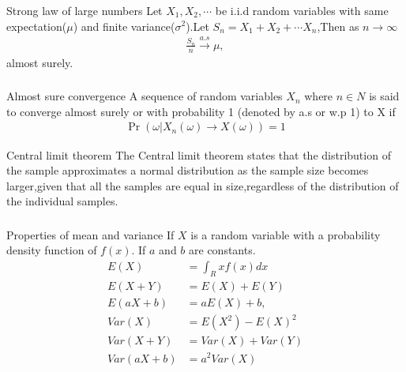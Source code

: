\documentclass{beamer}
\providecommand{\pr}[1]{\ensuremath{\Pr\left(#1\right)}}
\begin{document}
\begin{frame}
\frametitle{}
\begin{block}{Strong law of large numbers}
Let $X_1,X_2,\cdots $ be i.i.d random variables with same expectation($\mu$) and finite variance($\sigma^2$).Let $S_{n}=X_1+X_2+\cdots X_n$,Then as $n \to \infty$
\begin{align}
    \frac{S_n}{n} \xrightarrow{a.s}  \mu,
\end{align}
almost surely.
\end{block}

\frametitle{}
\begin{block}{Almost sure convergence}
A sequence of random variables $X_n$ where $n\in N$ is said to converge almost surely or with probability 1 (denoted by a.s or w.p 1) to X if \label{with prob 1}
\begin{align}
    \pr{\omega |X_n(\omega) \to X(\omega)}=1
\end{align}
\end{block}
\end{frame}

\begin{frame}{}
\begin{block}{Central limit theorem}
The Central limit theorem states that the distribution of the sample approximates a normal distribution as the sample size becomes larger,given that all the samples are equal in size,regardless of the distribution of the individual samples.
\end{block}    
\end{frame}

\begin{frame}
\frametitle{}
\begin{block}{Properties of mean and variance}
If $X$ is a random variable with a probability density function of $f(x)$. If $a$ and $b$ are constants.
\begin{align}
    \label{1}
    E(X)&=\int_R xf(x)dx\\ 
    \label{2}
    E(X+Y)&=E(X)+E(Y)\\    
    \label{3}
    E(aX+b)&=aE(X)+b, \\   
    \label{4}
    Var(X)&=E(X^2)-{E(X)}^2\\  
    \label{5}
    Var(X+Y)&=Var(X)+Var(Y)\\  
    \label{6}
    Var(aX+b)&=a^2 Var(X)
\end{align}
\end{block}
\end{frame}
\end{document}
